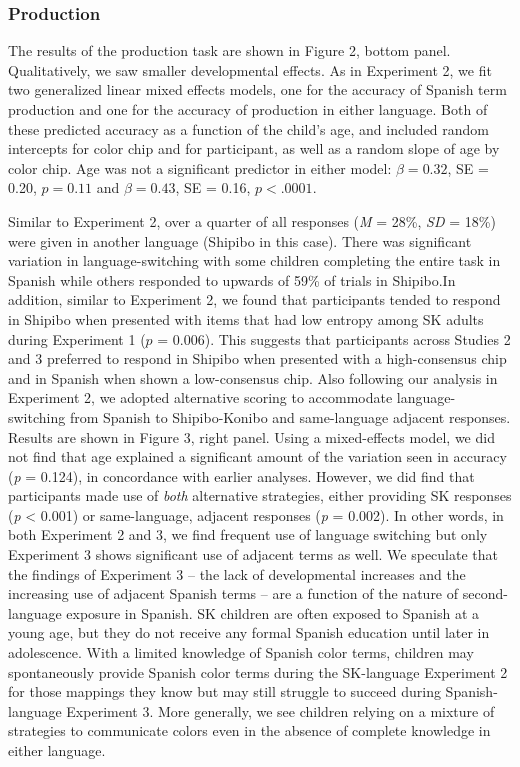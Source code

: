 \documentclass[
  english,
  ,man,floatsintext]{apa6}
\begin{document}
\hypertarget{production-1}{%
\subsubsection{Production}\label{production-1}}

The results of the production task are shown in Figure 2, bottom panel. Qualitatively, we saw smaller developmental effects. As in Experiment 2, we fit two generalized linear mixed effects models, one for the accuracy of Spanish term production and one for the accuracy of production in either language. Both of these predicted accuracy as a function of the child's age, and included random intercepts for color chip and for participant, as well as a random slope of age by color chip. Age was not a significant predictor in either model: \(\beta = 0.32\), SE = 0.20, \(p = 0.11\) and \(\beta = 0.43\), SE = 0.16, \(p < .0001\).

Similar to Experiment 2, over a quarter of all responses (\emph{M} = 28\%, \emph{SD} = 18\%) were given in another language (Shipibo in this case). There was significant variation in language-switching with some children completing the entire task in Spanish while others responded to upwards of 59\% of trials in Shipibo.In addition, similar to Experiment 2, we found that participants tended to respond in Shipibo when presented with items that had low entropy among SK adults during Experiment 1 (\(p\) = 0.006). This suggests that participants across Studies 2 and 3 preferred to respond in Shipibo when presented with a high-consensus chip and in Spanish when shown a low-consensus chip.
Also following our analysis in Experiment 2, we adopted alternative scoring to accommodate language-switching from Spanish to Shipibo-Konibo and same-language adjacent responses. Results are shown in Figure 3, right panel. Using a mixed-effects model, we did not find that age explained a significant amount of the variation seen in accuracy (\emph{p} = 0.124), in concordance with earlier analyses. However, we did find that participants made use of \emph{both} alternative strategies, either providing SK responses (\emph{p} \textless{} 0.001) or same-language, adjacent responses (\emph{p} = 0.002). In other words, in both Experiment 2 and 3, we find frequent use of language switching but only Experiment 3 shows significant use of adjacent terms as well.
We speculate that the findings of Experiment 3 -- the lack of developmental increases and the increasing use of adjacent Spanish terms -- are a function of the nature of second-language exposure in Spanish. SK children are often exposed to Spanish at a young age, but they do not receive any formal Spanish education until later in adolescence. With a limited knowledge of Spanish color terms, children may spontaneously provide Spanish color terms during the SK-language Experiment 2 for those mappings they know but may still struggle to succeed during Spanish-language Experiment 3. More generally, we see children relying on a mixture of strategies to communicate colors even in the absence of complete knowledge in either language.
\end{document}
